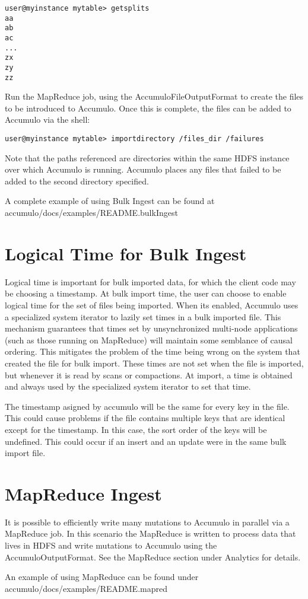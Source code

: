\small
\begin{verbatim}
user@myinstance mytable> getsplits
aa
ab
ac
...
zx
zy
zz
\end{verbatim}
\normalsize

Run the MapReduce job, using the AccumuloFileOutputFormat to create the files to
be introduced to Accumulo. Once this is complete, the files can be added to
Accumulo via the shell:

\small
\begin{verbatim}
user@myinstance mytable> importdirectory /files_dir /failures
\end{verbatim}
\normalsize

Note that the paths referenced are directories within the same HDFS instance over
which Accumulo is running. Accumulo places any files that failed to be added to the
second directory specified.

A complete example of using Bulk Ingest can be found at\\
accumulo/docs/examples/README.bulkIngest

\section{Logical Time for Bulk Ingest}

Logical time is important for bulk imported data, for which the client code may
be choosing a timestamp. At bulk import time, the user can choose to enable
logical time for the set of files being imported.  When its enabled, Accumulo
uses a specialized system iterator to lazily set times in a bulk imported file.
This mechanism guarantees that times set by unsynchronized multi-node
applications (such as those running on MapReduce) will maintain some semblance
of causal ordering. This mitigates the problem of the time being wrong on the
system that created the file for bulk import. These times are not set when the
file is imported, but whenever it is read by scans or compactions. At import, a
time is obtained and always used by the specialized system iterator to set that
time.

The timestamp asigned by accumulo will be the same for every key in the file.
This could cause problems if the file contains multiple keys that are identical
except for the timestamp.  In this case, the sort order of the keys will be
undefined. This could occur if an insert and an update were in the same bulk
import file.

\section{MapReduce Ingest}
It is possible to efficiently write many mutations to Accumulo in parallel via a
MapReduce job. In this scenario the MapReduce is written to process data that lives
in HDFS and write mutations to Accumulo using the AccumuloOutputFormat. See
the MapReduce section under Analytics for details.

An example of using MapReduce can be found under\\
accumulo/docs/examples/README.mapred

